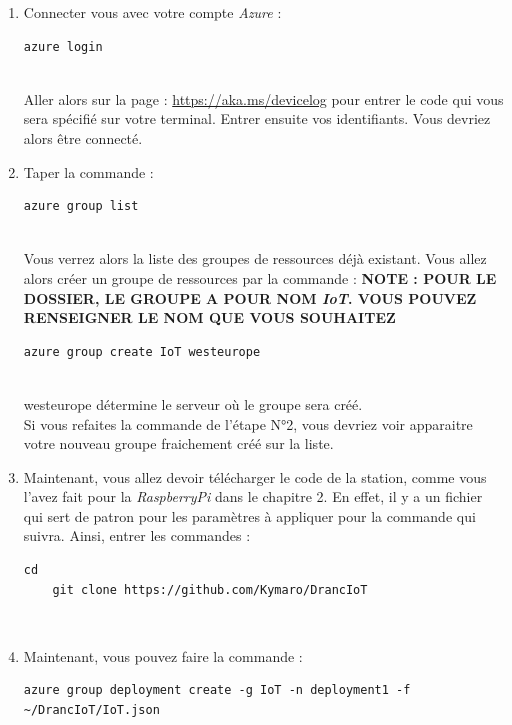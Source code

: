 \begin{enumerate}
	\item Connecter vous avec votre compte \textit{Azure} :
	\begin{lstlisting}[style=MyBashStyle]
	azure login
	\end{lstlisting}\\
	Aller alors sur la page : \href{https://aka.ms/devicelog}{https://aka.ms/devicelog} pour entrer le code qui vous sera spécifié sur votre terminal. Entrer ensuite vos identifiants. Vous devriez alors être connecté. %
	\item Taper la commande :
	\begin{lstlisting}[style=MyBashStyle]
	azure group list
	\end{lstlisting}\\
Vous verrez alors la liste des groupes de ressources déjà existant. Vous allez alors créer un groupe de ressources par la commande : 
	\textbf{NOTE : POUR LE DOSSIER, LE GROUPE A POUR NOM \textit{IoT}. VOUS POUVEZ RENSEIGNER LE NOM QUE VOUS SOUHAITEZ}\\
	\begin{lstlisting}[style=MyBashStyle]
	azure group create IoT westeurope
	\end{lstlisting}\\
westeurope détermine le serveur où le groupe sera créé. %
\\
Si vous refaites la commande de l'étape N°2, vous devriez voir apparaitre votre nouveau groupe fraichement créé sur la liste.
	\item Maintenant, vous allez devoir télécharger le code de la station, comme vous l'avez fait pour la \textit{RaspberryPi} dans le chapitre 2. En effet, il y a un fichier qui sert de patron pour les paramètres à appliquer pour la commande qui suivra. Ainsi, entrer les commandes : 
	\begin{lstlisting}[style=MyBashStyle]
	cd
	git clone https://github.com/Kymaro/DrancIoT
	\end{lstlisting}\\
	\item Maintenant, vous pouvez faire la commande :
	\begin{lstlisting}[style=MyBashStyle]
azure group deployment create -g IoT -n deployment1 -f ~/DrancIoT/IoT.json
	\end{lstlisting}\\


\end{enumerate}
